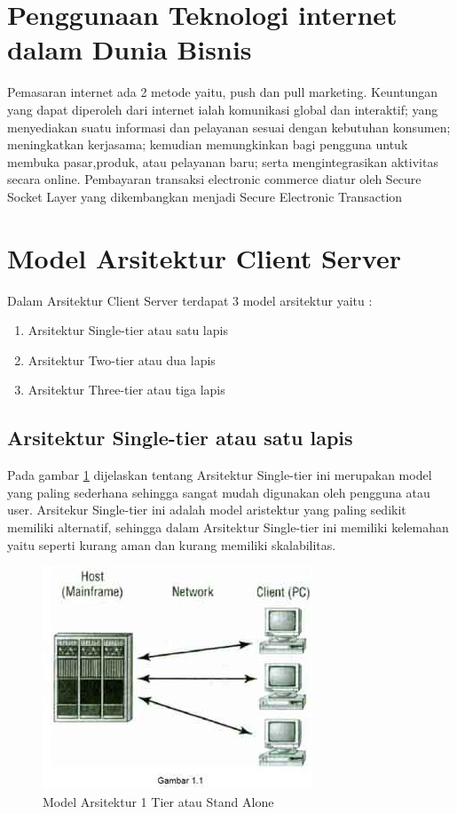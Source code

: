 \section{Penggunaan Teknologi internet dalam Dunia Bisnis}
Pemasaran internet ada 2 metode yaitu, push dan pull marketing. Keuntungan yang dapat diperoleh dari internet ialah komunikasi 
global dan interaktif; yang menyediakan suatu informasi dan pelayanan sesuai dengan kebutuhan konsumen; meningkatkan kerjasama; 
kemudian memungkinkan bagi pengguna untuk membuka pasar,produk, atau pelayanan baru; serta mengintegrasikan aktivitas secara online. 
Pembayaran transaksi electronic commerce diatur oleh Secure Socket Layer yang dikembangkan menjadi Secure Electronic Transaction

\section{Model Arsitektur Client Server}
Dalam Arsitektur Client Server terdapat 3 model arsitektur yaitu :

\begin{enumerate}
	\item Arsitektur Single-tier atau satu lapis
	\item Arsitektur Two-tier atau dua lapis
	\item Arsitektur Three-tier atau tiga lapis
\end{enumerate}

\subsection{Arsitektur Single-tier atau satu lapis}
Pada gambar \ref{Stand} dijelaskan tentang Arsitektur Single-tier ini merupakan model yang paling sederhana sehingga sangat mudah digunakan oleh pengguna atau user.
Arsitekur Single-tier ini adalah model aristektur yang paling sedikit memiliki alternatif, sehingga dalam Arsitektur Single-tier ini
memiliki kelemahan yaitu seperti kurang aman dan kurang memiliki skalabilitas.

\begin{figure}[h]
    \centerline{\includegraphics{figures/2modelstandalone.JPG}}
    \caption{Model Arsitektur 1 Tier atau Stand Alone}
    \label{Stand}
\end{figure}

